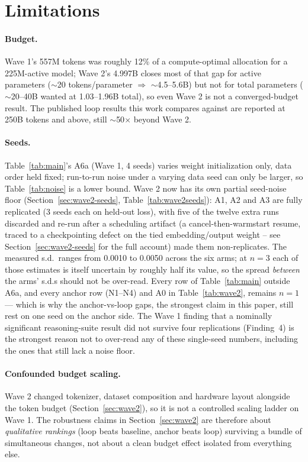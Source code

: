 \documentclass[11pt,a4paper]{article}
\begin{document}
\section{Limitations}

\paragraph{Budget.} Wave 1's 557M tokens was roughly 12\% of a compute-optimal allocation for a
225M-active model; Wave 2's 4.997B closes most of that gap for active parameters ($\sim$20
tokens/parameter $\Rightarrow$ $\sim$4.5--5.6B) but not for total parameters ($\sim$20--40B wanted
at 1.03--1.96B total), so even Wave 2 is not a converged-budget result. The published loop results
this work compares against are reported at 250B tokens and above, still $\sim$50$\times$ beyond
Wave 2.

\paragraph{Seeds.} Table~\ref{tab:main}'s A6a (Wave 1, 4 seeds) varies weight initialization only,
data order held fixed; run-to-run noise under a varying data seed can only be larger, so
Table~\ref{tab:noise} is a lower bound. Wave 2 now has its own partial seed-noise floor
(Section~\ref{sec:wave2-seeds}, Table~\ref{tab:wave2seeds}): A1, A2 and A3 are fully replicated (3
seeds each on held-out loss), with five of the twelve extra runs discarded and re-run after a
scheduling artifact (a cancel-then-warmstart resume, traced to a checkpointing defect on the tied
embedding/output weight -- see Section~\ref{sec:wave2-seeds} for the full account) made them
non-replicates. The measured s.d.\ ranges from 0.0010 to 0.0050 across the six arms; at $n=3$ each
of those estimates is itself uncertain by roughly half its value, so the spread \emph{between} the
arms' s.d.s should not be over-read. Every row of Table~\ref{tab:main} outside A6a, and every anchor
row (N1--N4) and A0 in Table~\ref{tab:wave2}, remains $n=1$ --- which is why the anchor-vs-loop gaps,
the strongest claim in this paper, still rest on one seed on the anchor side. The Wave 1 finding that a nominally
significant reasoning-suite result did not survive four replications (Finding~4) is the strongest
reason not to over-read any of these single-seed numbers, including the ones that still lack a
noise floor.

\paragraph{Confounded budget scaling.} Wave 2 changed tokenizer, dataset composition and hardware
layout alongside the token budget (Section~\ref{sec:wave2}), so it is not a controlled scaling
ladder on Wave 1. The robustness claims in Section~\ref{sec:wave2} are therefore about
\emph{qualitative rankings} (loop beats baseline, anchor beats loop) surviving a bundle of
simultaneous changes, not about a clean budget effect isolated from everything else.
\end{document}
